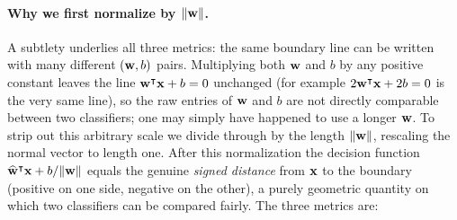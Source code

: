 \documentclass[11pt, letterpaper]{article}
\begin{document}
\paragraph{Why we first normalize by $\|\vb{w}\|$.} A subtlety underlies all three metrics: the same boundary line can be written with many different $(\vb{w}, b)$ pairs. Multiplying both $\vb{w}$ and $b$ by any positive constant leaves the line $\vb{w}^{\intercal}\vb{x} + b = 0$ unchanged (for example $2\vb{w}^{\intercal}\vb{x} + 2b = 0$ is the very same line), so the raw entries of $\vb{w}$ and $b$ are not directly comparable between two classifiers; one may simply have happened to use a longer $\vb{w}$. To strip out this arbitrary scale we divide through by the length $\|\vb{w}\|$, rescaling the normal vector to length one. After this normalization the decision function $\widehat{\vb{w}}^{\intercal}\vb{x} + b/\|\vb{w}\|$ equals the genuine \emph{signed distance} from $\vb{x}$ to the boundary (positive on one side, negative on the other), a purely geometric quantity on which two classifiers can be compared fairly. The three metrics are:
\end{document}
